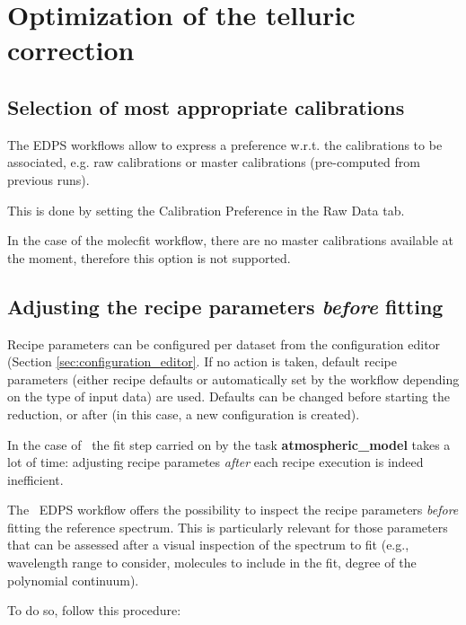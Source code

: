 \section{Optimization of the telluric correction}
\label{sec:configuretion_overview}

\subsection{Selection of most appropriate calibrations}

The EDPS workflows allow to express a preference w.r.t. the
calibrations to be associated, e.g. raw calibrations or master
calibrations (pre-computed from previous runs).

This is done by setting the Calibration Preference in the Raw Data
tab.

In the case of the molecfit workflow, there are no master calibrations
available at the moment, therefore this option is not supported.

\subsection{Adjusting the recipe parameters {\it before } fitting}
\label{sec:adjust_recipe_parameters}

Recipe parameters can be configured per dataset from the configuration
editor (Section \ref{sec:configuration_editor}. If no action is taken,
default recipe parameters (either recipe defaults or automatically set
by the workflow depending on the type of input data) are
used. Defaults can be changed before starting the reduction, or
after (in this case, a new configuration is created).

In the case of \pipename\ the fit step carried on by the task {\bf
  atmospheric\_model} takes a lot of time: adjusting recipe parametes
{\it after} each recipe execution is indeed inefficient.

The \pipename\ EDPS workflow offers the possibility to inspect the
recipe parameters {\it before} fitting the reference spectrum. This is
particularly relevant for those parameters that can be assessed after
a visual inspection of the spectrum to fit (e.g., wavelength range to
consider, molecules to include in the fit, degree of the polynomial
continuum).

To do so, follow this procedure:

